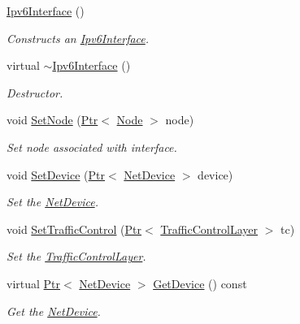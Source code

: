 \begin{DoxyCompactItemize}
\item 
\hyperlink{classns3_1_1Ipv6Interface_a2f1b354b13fabe08717e1d05e5ada2d5}{Ipv6\+Interface} ()
\begin{DoxyCompactList}\small\item\em Constructs an \hyperlink{classns3_1_1Ipv6Interface}{Ipv6\+Interface}. \end{DoxyCompactList}\item 
virtual \hyperlink{classns3_1_1Ipv6Interface_a8c177dfc6dd954eda098c10fee6284f9}{$\sim$\+Ipv6\+Interface} ()
\begin{DoxyCompactList}\small\item\em Destructor. \end{DoxyCompactList}\item 
void \hyperlink{classns3_1_1Ipv6Interface_a47ceb7004af6a03ff10dda1502578d84}{Set\+Node} (\hyperlink{classns3_1_1Ptr}{Ptr}$<$ \hyperlink{classns3_1_1Node}{Node} $>$ node)
\begin{DoxyCompactList}\small\item\em Set node associated with interface. \end{DoxyCompactList}\item 
void \hyperlink{classns3_1_1Ipv6Interface_ada6289ac67957252a4a2c1bbae61bd78}{Set\+Device} (\hyperlink{classns3_1_1Ptr}{Ptr}$<$ \hyperlink{classns3_1_1NetDevice}{Net\+Device} $>$ device)
\begin{DoxyCompactList}\small\item\em Set the \hyperlink{classns3_1_1NetDevice}{Net\+Device}. \end{DoxyCompactList}\item 
void \hyperlink{classns3_1_1Ipv6Interface_ac37f07ebab3ebd35d2189d0682ff8fab}{Set\+Traffic\+Control} (\hyperlink{classns3_1_1Ptr}{Ptr}$<$ \hyperlink{classns3_1_1TrafficControlLayer}{Traffic\+Control\+Layer} $>$ tc)
\begin{DoxyCompactList}\small\item\em Set the \hyperlink{classns3_1_1TrafficControlLayer}{Traffic\+Control\+Layer}. \end{DoxyCompactList}\item 
virtual \hyperlink{classns3_1_1Ptr}{Ptr}$<$ \hyperlink{classns3_1_1NetDevice}{Net\+Device} $>$ \hyperlink{classns3_1_1Ipv6Interface_a31e06ee5ec327437ab37dddab3c85807}{Get\+Device} () const 
\begin{DoxyCompactList}\small\item\em Get the \hyperlink{classns3_1_1NetDevice}{Net\+Device}. \end{DoxyCompactList}\item 

\end{DoxyCompactItemize}
